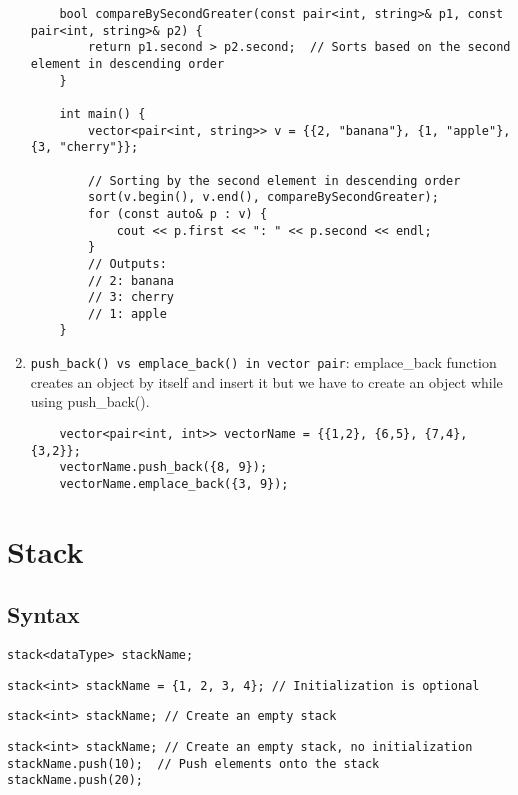 \documentclass{article}
\begin{document}
\begin{enumerate}
\begin{lstlisting}
    bool compareBySecondGreater(const pair<int, string>& p1, const pair<int, string>& p2) {
        return p1.second > p2.second;  // Sorts based on the second element in descending order
    }

    int main() {
        vector<pair<int, string>> v = {{2, "banana"}, {1, "apple"}, {3, "cherry"}};

        // Sorting by the second element in descending order
        sort(v.begin(), v.end(), compareBySecondGreater);
        for (const auto& p : v) {
            cout << p.first << ": " << p.second << endl;
        }
        // Outputs: 
        // 2: banana
        // 3: cherry
        // 1: apple
    }
    \end{lstlisting}

    \item \texttt{push\_back() vs emplace\_back() in vector pair}: emplace\_back function creates an object by itself and insert it but we have to create an object while using push\_back().
    \begin{lstlisting}
    vector<pair<int, int>> vectorName = {{1,2}, {6,5}, {7,4}, {3,2}};
    vectorName.push_back({8, 9});
    vectorName.emplace_back({3, 9});
    \end{lstlisting}
\end{enumerate}

\newpage
\section{Stack}

\subsection{Syntax}

\begin{lstlisting}
stack<dataType> stackName; 
\end{lstlisting}

\begin{lstlisting}
stack<int> stackName = {1, 2, 3, 4}; // Initialization is optional
\end{lstlisting}

\begin{lstlisting}
stack<int> stackName; // Create an empty stack
\end{lstlisting}

\begin{lstlisting}
stack<int> stackName; // Create an empty stack, no initialization
stackName.push(10);  // Push elements onto the stack
stackName.push(20);
\end{lstlisting}
\end{document}
